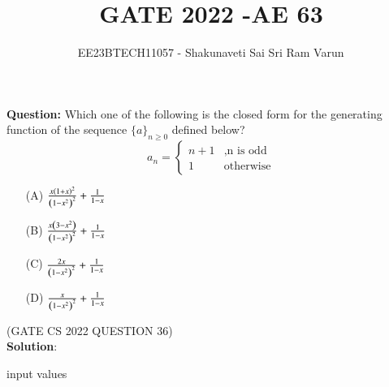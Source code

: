 \documentclass[journal,12pt,twocolumn]{IEEEtran}
\theoremstyle{remark}
\begin{document}

\vspace{3cm}

\title{GATE 2022  -AE 63}
\author{EE23BTECH11057 - Shakunaveti Sai Sri Ram Varun$^{}$%
}
\maketitle
\newpage
\bigskip
\vspace{2cm}
\textbf{Question: }
Which one of the following is the closed form for the generating function of the sequence $ \bigl\{ a \bigl\}_{n \geq0}$ defined below?
\begin{equation}
a_n=
    \begin{cases}
        n+1 & , \text{n is odd}\\
        1 & \text{otherwise}
    \end{cases}
\end{equation}\label{eq: 22cs361}


\begin{enumerate}
    \item[(A)] $ \frac{x\left(1+x\right)^2}{\left(1-x^2\right)^2} + \frac{1}{1-x}$
    \item[(B)]$ \frac{x\left(3-x^2\right)}{\left(1-x^2\right)^2} + \frac{1}{1-x}$
    \item[(C)] $ \frac{2x}{\left(1-x^2\right)^2} + \frac{1}{1-x}$
    \item[(D)] $ \frac{x}{\left(1-x^2\right)^2} + \frac{1}{1-x}$  
\end{enumerate}
\hfill(GATE CS 2022 QUESTION 36)\\
\textbf{Solution}:\\
\begin{table}[h!] 
\centering

\caption{input values}
\label{tab: Table2022cs36}
\end{table}
\end{document}
